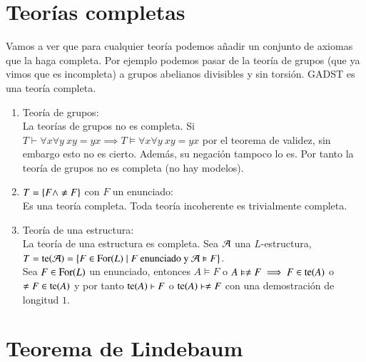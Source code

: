 \section{Teorías completas}


Vamos a ver que para cualquier teoría podemos añadir un conjunto de axiomas que la haga completa. Por ejemplo podemos pasar de la teoría de grupos (que ya vimos que es incompleta)
a grupos abelianos divisibles y sin torsión. GADST es una teoría completa.

\begin{eg}
    \begin{enumerate}[(1)]
        \item Teoría de grupos:\\
        La teorías de grupos no es completa. Si $T \vdash \forall x \forall y\ xy = yx \implies T \vDash \forall x \forall y\ xy=yx$ por el teorema de validez, sin embargo esto no es cierto. Además, su negación tampoco lo es. Por tanto la teoría de grupos no es completa (no hay modelos).
        \item $T = \left\{F \land \neq F\right\}$ con $F$ un enunciado:\\
        Es una teoría completa. Toda teoría incoherente es trivialmente completa.
        \item Teoría de una estructura:\\
        La teoría de una estructura es completa. Sea $\mathcal{A}$ una $L$-estructura, $T = \mathrm{te}(\mathcal{A}) = \left\{ F \in \mathrm{For}(L) \mid F \text{ enunciado y } \mathcal{A} \vDash F\right\}$.\\
        Sea $F\in \mathrm{For}(L)$ un enunciado, entonces $A \vDash F$ o $A \vDash \neq F \implies F \in \mathrm{te}(A)$ o $\neq F \in \mathrm{te}(A)$ y por tanto $\mathrm{te}(A) \vdash F$ o $\mathrm{te}(A) \vdash \neq F$ con una demostración de longitud $1$.
    \end{enumerate}
\end{eg}

\section{Teorema de Lindebaum}

